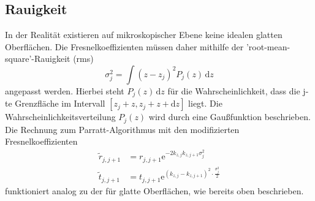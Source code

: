 \subsection{Rauigkeit}
In der Realität existieren auf mikroskopischer Ebene keine idealen glatten Oberflächen.
Die Fresnelkoeffizienten müssen daher mithilfe der 'root-mean-square'-Rauigkeit (rms)
\begin{equation*}
    \sigma_j^2 = \int \left ( z - z_j \right )^2 P_j(z) \, \mathrm{d}z
    \label{eqn:rms}
\end{equation*}
angepasst werden.
Hierbei steht $P_j(z) \, \mathrm{d}z$ für die Wahrscheinlichkeit, dass die j-te Grenzfläche im Intervall $[z_j + z, z_j + z + \mathrm{d}z]$ liegt.
Die Wahrscheinlichkeitsverteilung $P_j(z)$ wird durch eine Gaußfunktion beschrieben.
Die Rechnung zum Parratt-Algorithmus mit den modifizierten Fresnelkoeffizienten
\begin{align*}
    \tilde{r}_{j,j+1} &= {r}_{j,j+1} \mathrm{e}^{-2 k_{z,j} k_{z,j+1} \sigma_j^2} \label{eqn:mod_fresnel_r} \\
    \tilde{t}_{j,j+1} &= {t}_{j,j+1} \mathrm{e}^{(k_{z,j} - k_{z,j+1})^2 \cdot \frac{\sigma_j^2}{2}} \label{eqn:mod_fresnel_t}
\end{align*}
funktioniert analog zu der für glatte Oberflächen, wie bereits oben beschrieben.
\FloatBarrier

